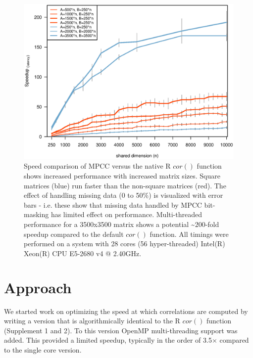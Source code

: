 \documentclass{bioinfo}
\begin{document}
\begin{figure}[H]
\centering
\includegraphics[width=\linewidth]{img/figure02big.eps}
  \caption{ \small Speed comparison of MPCC versus the native R $cor()$
  function shows increased performance with increased matrix
  sizes. Square matrices (blue) run faster than the non-square
  matrices (red).  The effect of handling missing data (0 to 50\%) is
  visualized with error bars - i.e. these show that missing data
  handled by MPCC bit-masking has limited effect on performance.
  Multi-threaded performance for a 3500x3500 matrix shows a potential
   \textasciitilde{}$200$-fold speedup compared to the default $cor()$ function.  All
  timings were performed on a system with 28 cores (56 hyper-threaded)
  Intel(R) Xeon(R) CPU E5-2680 v4 @ 2.40GHz.  } \label{fig:fig1}
\end{figure}

\vspace*{-10mm}


\section{Approach}

We started work on optimizing the speed at which correlations are computed 
by writing a version that is algorithmically identical to the R $cor()$ function
(Supplement 1 and 2). To this version OpenMP multi-threading support was added. 
This provided a limited speedup, typically in the order of
3.5$\times$ compared to the single core version. 
\end{document}
